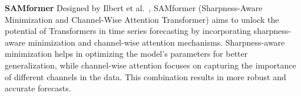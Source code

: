 \noindent\textbf
{SAMformer}
 Designed by Ilbert et al.~\cite{ilbert2024samformerunlockingpotentialtransformers}, SAMformer (Sharpness-Aware Minimization and Channel-Wise Attention Transformer) aims to unlock the potential of Transformers in time series forecasting by incorporating sharpness-aware minimization and channel-wise attention mechanisms. Sharpness-aware minimization helps in optimizing the model’s parameters for better generalization, while channel-wise attention focuses on capturing the importance of different channels in the data. This combination results in more robust and accurate forecasts.
